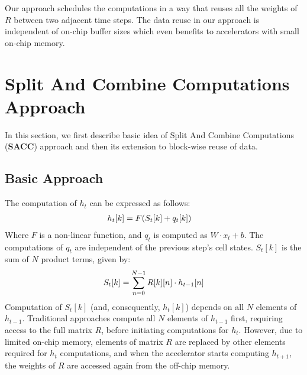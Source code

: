 Our approach schedules the computations in a way that reuses all the weights of $R$ between two adjacent time steps. The data reuse in our approach is independent of on-chip buffer sizes which even benefits to accelerators with small on-chip memory. 

\section{Split And Combine Computations Approach}
In this section, we first describe basic idea of Split And Combine Computations (\textbf{SACC}) approach and then its extension to block-wise reuse of data.
\subsection{Basic Approach}\label{sec:elementWiseApproach}
The computation of $h_t$ can be expressed as follows:
\begin{align}\label{eq:h_{t}}
	h_{t}[k] &= F( S_{t}[k]+q_{t}[k])
\end{align}
Where $F$ is a non-linear function, and $q_{t}$ is computed as $W{\cdot}x_t{+}b$. The computations of $q_{t}$ are independent of the previous step's cell states. $S_{t}[k]$ is the sum of $N$ product terms, given by:
\begin{align}\label{eq:S_{t}}
	S_{t}[k] = \sum_{n=0}^{N-1}R[k][n]\cdot h_{t-1}[n]
\end{align}
Computation of $S_{t}[k]$ (and, consequently, $h_{t}[k]$) depends on all $N$ elements of $h_{t-1}$. Traditional approaches compute all $N$ elements of $h_{t-1}$ first, requiring access to the full matrix $R$, before initiating computations for $h_{t}$. However, due to limited on-chip memory, elements of matrix $R$ are replaced by other elements required for $h_{t}$ computations, and when the accelerator starts computing $h_{t+1}$, the weights of $R$ are accessed again from the off-chip memory.

